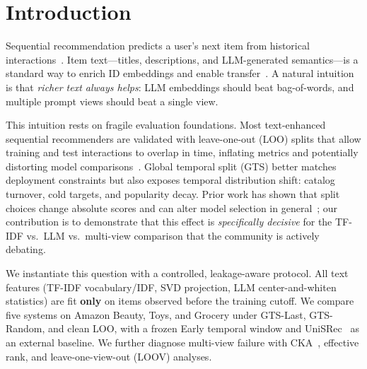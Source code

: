 \documentclass[sigconf,natbib=true,anonymous]{acmart}
\newcommand{\tfidf}{\textsc{TF-IDF}\xspace}
\newcommand{\llm}{\textsc{LLM}\xspace}
\begin{document}

\maketitle

\section{Introduction}
\label{sec:intro}

Sequential recommendation predicts a user's next item from historical interactions~\cite{kang2018sasrec,sun2019bert4rec,hidasi2016gru4rec}.
Item text---titles, descriptions, and LLM-generated semantics---is a standard way to enrich ID embeddings and enable transfer~\cite{hou2022unisrec,bao2023tallrec}.
A natural intuition is that \emph{richer text always helps}: \llm embeddings should beat bag-of-words, and multiple prompt views should beat a single view.

This intuition rests on fragile evaluation foundations.
Most text-enhanced sequential recommenders are validated with leave-one-out (LOO) splits that allow training and test interactions to overlap in time, inflating metrics and potentially distorting model comparisons~\cite{ji2023evaluation,sun2023reevaluation}.
Global temporal split (GTS) better matches deployment constraints but also exposes temporal distribution shift: catalog turnover, cold targets, and popularity decay.
Prior work has shown that split choices change absolute scores and can alter model selection in general~\cite{meng2020temporal,ji2023evaluation}; our contribution is to demonstrate that this effect is \emph{specifically decisive} for the \tfidf vs.\ \llm vs.\ multi-view comparison that the community is actively debating.

We instantiate this question with a controlled, leakage-aware protocol.
All text features (TF-IDF vocabulary/IDF, SVD projection, LLM center-and-whiten statistics) are fit \textbf{only} on items observed before the training cutoff.
We compare five systems on Amazon Beauty, Toys, and Grocery under GTS-Last, GTS-Random, and clean LOO, with a frozen Early temporal window and UniSRec~\cite{hou2022unisrec} as an external baseline.
We further diagnose multi-view failure with CKA~\cite{kornblith2019cka}, effective rank, and leave-one-view-out (LOOV) analyses.
\end{document}
